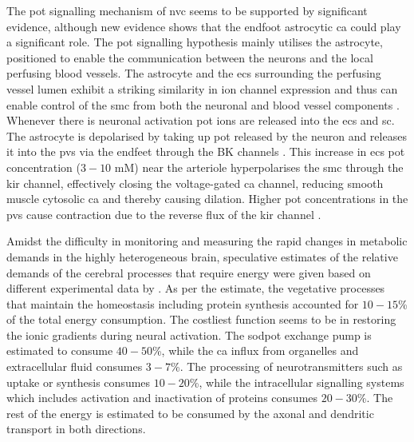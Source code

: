 The \gls{pot} signalling mechanism of \gls{nvc} seems to be supported by significant evidence, although new evidence shows that the endfoot astrocytic \gls{ca} could play a significant role. The \gls{pot} signalling hypothesis mainly utilises the astrocyte,  positioned to enable the communication between the neurons and the local perfusing blood vessels. The astrocyte and the \glspl{ec} surrounding the perfusing vessel lumen exhibit a striking similarity in ion channel expression and thus can enable control of the \gls{smc} from both the neuronal and blood vessel components \citep{Longden2015}. Whenever there is neuronal activation \gls{pot} ions are released into the \gls{ecs} and \gls{sc}. The astrocyte is depolarised by taking up \gls{pot} released by the neuron and releases it into the \gls{pvs} via the endfeet through the BK channels \citep{Filosa2007}. This increase in \gls{ecs} \gls{pot} concentration ($3-10$ mM) near the arteriole hyperpolarises the \gls{smc} through the \gls{kir} channel, effectively closing the voltage-gated \gls{ca} channel, reducing smooth muscle cytosolic \gls{ca} and thereby causing dilation. Higher \gls{pot} concentrations in the \gls{pvs} cause contraction due to the reverse flux of the \gls{kir} channel \citep{Farr2011}. 

Amidst the difficulty in monitoring and measuring the rapid changes in metabolic demands in the highly heterogeneous brain, speculative estimates of the relative demands of the cerebral processes that require energy were given based on different experimental data by \citet{Ames2000}. As per the estimate, the vegetative processes that maintain the homeostasis including protein synthesis accounted for $10-15$\% of the total energy consumption. The costliest function seems to be in  restoring the ionic gradients during neural activation. The \gls{sodpot} exchange pump is estimated to consume $40-50$\%, while the \gls{ca} influx from organelles and extracellular fluid consumes $3-7$\%. The processing of neurotransmitters such as uptake or synthesis consumes $10-20$\%, while the intracellular signalling systems which includes activation and inactivation of proteins consumes $20-30$\%. The rest of the energy is estimated to be consumed by the axonal and dendritic transport in both directions.


